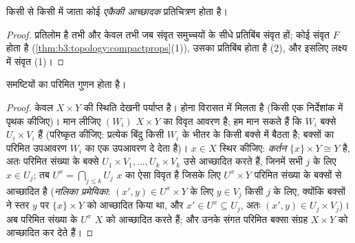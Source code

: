 \begin{corollary}\label{cor:b3:topology:compacthomeo}
किसी  से किसी  में जाता कोई 
\emph{एकैकी आच्छादक} प्रतिचित्रण  होता है।
\end{corollary}

\begin{proof}
प्रतिलोम  है तभी और केवल तभी जब संवृत समुच्चयों के सीधे
प्रतिबिंब संवृत हों; कोई संवृत $F$  होता है (\cref{thm:b3:topology:compactprops}(1)),
उसका प्रतिबिंब  होता है (2), और इसलिए  लक्ष्य में
संवृत (1)।
\end{proof}

\begin{theorem}[परिमित गुणन]\label{thm:b3:topology:tychonoff}
 समष्टियों का परिमित गुणन  होता है।
\end{theorem}

\begin{proof}
केवल $X \times Y$ की स्थिति देखनी पर्याप्त है।  होना विरासत में
मिलता है (किसी एक निर्देशांक में पृथक कीजिए)। मान लीजिए $(W_i)$
$X
\times Y$ का विवृत आवरण है; हम मान सकते हैं कि $W_i$  बक्से
$U_i \times
V_i$ हैं (परिष्कृत कीजिए: प्रत्येक बिंदु किसी $W_i$ के भीतर के
किसी बक्से में बैठता है; बक्सों का परिमित उपआवरण $W_i$ का एक
उपआवरण दे देता है)। $x \in X$ स्थिर कीजिए: \emph{कर्तन} $\{x\}\times Y \cong Y$ 
है, अतः परिमित संख्या के बक्से $U_1\times V_1, \dots, U_k\times V_k$ उसे आच्छादित करते हैं, जिनमें
सभी $j$ के लिए $x \in U_j$; तब $U^x = \bigcap_{j \leq k} U_j$ $x$ का ऐसा विवृत  है
जिसके लिए $U^x \times Y$ परिमित संख्या के बक्सों से आच्छादित है
(\emph{नलिका प्रमेयिका}: $(x', y) \in U^x \times Y$ के लिए
$y \in V_j$ किसी $j$ के लिए, क्योंकि बक्सों ने स्तर $y$ पर $\{x\}\times Y$ को
आच्छादित किया था, और $x' \in U^x \subseteq U_j$, अतः $(x', y) \in U_j
\times V_j$)। अब परिमित संख्या के
$U^x$  $X$ को आच्छादित करते हैं; और उनके संगत परिमित बक्सा
संग्रह $X \times Y$ को आच्छादित कर देते हैं।
\end{proof}


